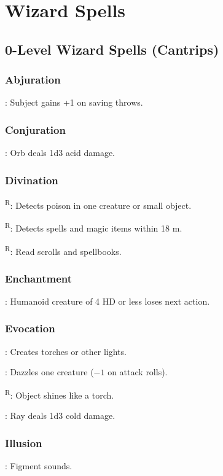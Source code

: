 \section{Wizard Spells}



\subsection{0-Level Wizard Spells (Cantrips)}

\subsubsection{Abjuration}
	: Subject gains +1 on saving throws.

\subsubsection{Conjuration}
	: Orb deals 1d3 acid damage.

\subsubsection{Divination}
	\textsuperscript{R}: Detects poison in one creature or small object.

	\textsuperscript{R}: Detects spells and magic items within 18 m.

	\textsuperscript{R}: Read scrolls and spellbooks.

\subsubsection{Enchantment}
	: Humanoid creature of 4 HD or less loses next action.

\subsubsection{Evocation}
	: Creates torches or other lights.

	: Dazzles one creature ($-1$ on attack rolls).

	\textsuperscript{R}: Object shines like a torch.

	: Ray deals 1d3 cold damage.

\subsubsection{Illusion}
	: Figment sounds.

